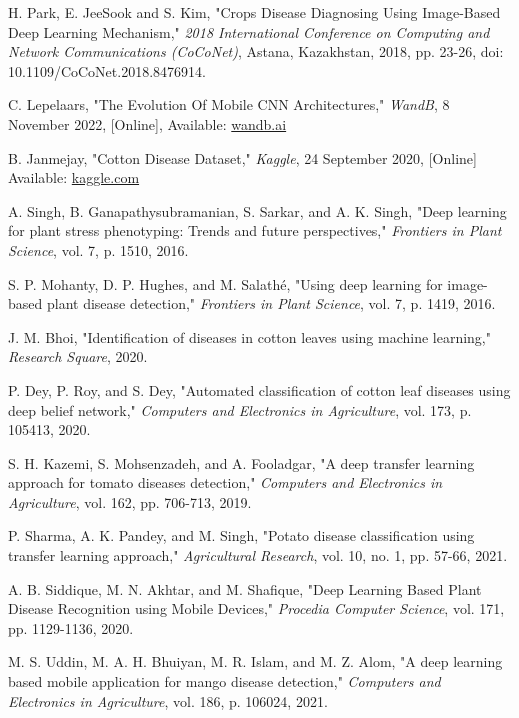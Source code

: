 \documentclass[conference]{IEEEtran}
\begin{document}
\begin{thebibliography}{00}
 H. Park, E. JeeSook and S. Kim, "Crops Disease Diagnosing Using Image-Based Deep Learning Mechanism," \textit{2018 International Conference on Computing and Network Communications (CoCoNet)}, Astana, Kazakhstan, 2018, pp. 23-26, doi: 10.1109/CoCoNet.2018.8476914.

 C. Lepelaars, "The Evolution Of Mobile CNN Architectures," \textit{WandB}, 8 November 2022, [Online], Available: \href{https://wandb.ai/carlolepelaars/mobile_architectures/reports/The-Evolution-Of-Mobile-CNN-Architectures--VmlldzoyMDQ0ODQ}{wandb.ai}

 B. Janmejay, "Cotton Disease Dataset," \textit{Kaggle}, 24 September 2020, [Online] Available: \href{https://www.kaggle.com/janmejaybhoi/cotton-disease-dataset/notebooks}{kaggle.com}


 A. Singh, B. Ganapathysubramanian, S. Sarkar, and A. K. Singh, "Deep learning for plant stress phenotyping: Trends and future perspectives," \textit{Frontiers in Plant Science}, vol. 7, p. 1510, 2016.

 S. P. Mohanty, D. P. Hughes, and M. Salathé, "Using deep learning for image-based plant disease detection," \textit{Frontiers in Plant Science}, vol. 7, p. 1419, 2016.

 J. M. Bhoi, "Identification of diseases in cotton leaves using machine learning," \textit{Research Square}, 2020.

 P. Dey, P. Roy, and S. Dey, "Automated classification of cotton leaf diseases using deep belief network," \textit{Computers and Electronics in Agriculture}, vol. 173, p. 105413, 2020.

 S. H. Kazemi, S. Mohsenzadeh, and A. Fooladgar, "A deep transfer learning approach for tomato diseases detection," \textit{Computers and Electronics in Agriculture}, vol. 162, pp. 706-713, 2019.

 P. Sharma, A. K. Pandey, and M. Singh, "Potato disease classification using transfer learning approach," \textit{Agricultural Research}, vol. 10, no. 1, pp. 57-66, 2021.

 A. B. Siddique, M. N. Akhtar, and M. Shafique, "Deep Learning Based Plant Disease Recognition using Mobile Devices," \textit{Procedia Computer Science}, vol. 171, pp. 1129-1136, 2020.

 M. S. Uddin, M. A. H. Bhuiyan, M. R. Islam, and M. Z. Alom, "A deep learning based mobile application for mango disease detection," \textit{Computers and Electronics in Agriculture}, vol. 186, p. 106024, 2021.


\end{thebibliography}
\end{document}
